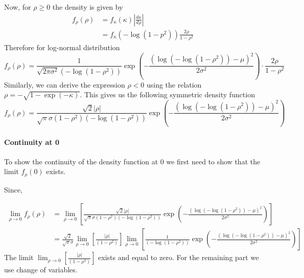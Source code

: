 \documentclass{amsart}
\begin{document}
Now, for $\rho \ge 0$ the density is given by
\begin{align}
	f_{\rho}(\rho)&=f_{\kappa}(\kappa)\left|\frac{d \kappa}{d \rho}\right|\\
	&=f_{\kappa}\left(-\log(1-p^2)\right)\frac{2\rho}{1-\rho^2}
\end{align}
Therefore for log-normal distribution
\begin{equation}
	f_{\rho}(\rho)
	= \frac{1}{\sqrt{2\pi\sigma^2}(-\log(1-\rho^2))} 
	\exp\left(-\frac{(\log(-\log(1-\rho^2))-\mu)^2}{2\sigma^2}\right)
	\cdot \frac{2\rho}{1-\rho^2}
\end{equation}
Similarly, we can derive the expression $\rho<0$ using the relation
$\rho = -\sqrt{1-\exp(-\kappa)}$. This gives us the following
symmetric density function
\begin{equation}
	f_{\rho}(\rho)
	= \frac{\sqrt{2}|\rho|}{\sqrt{\pi}\sigma(1-\rho^2)(-\log(1-\rho^2))} 
	\exp\left(-\frac{(\log(-\log(1-\rho^2))-\mu)^2}{2\sigma^2}\right)
\end{equation}

\paragraph{Continuity at 0} To show the continuity of the density function at 0 we first need to show that the limit $f_{\rho}(0)$
exists.

Since,

\begin{align}
	\lim_{\rho\to 0}f_{\rho}(\rho)
	&= \lim_{\rho\to 0}\left[\frac{\sqrt{2}|\rho|}{\sqrt{\pi}\sigma(1-\rho^2)(-\log(1-\rho^2))} 
	\exp\left(-\frac{(\log(-\log(1-\rho^2))-\mu)^2}{2\sigma^2}\right)\right]\\
	&= \frac{\sqrt{2}}{\sqrt{\pi}\sigma}\lim_{\rho\to 0}\left[\frac{|\rho|}{(1-\rho^2)} \right]
	\lim_{\rho\to 0}\left[\frac{1}{(-\log(1-\rho^2))} 
	\exp\left(-\frac{(\log(-\log(1-\rho^2))-\mu)^2}{2\sigma^2}\right)\right]
\end{align}
The limit $\lim_{\rho\to 0}\left[\frac{|\rho|}{(1-\rho^2)} \right]$ exists and equal to zero. For the remaining part we use change of variables.
\end{document}
